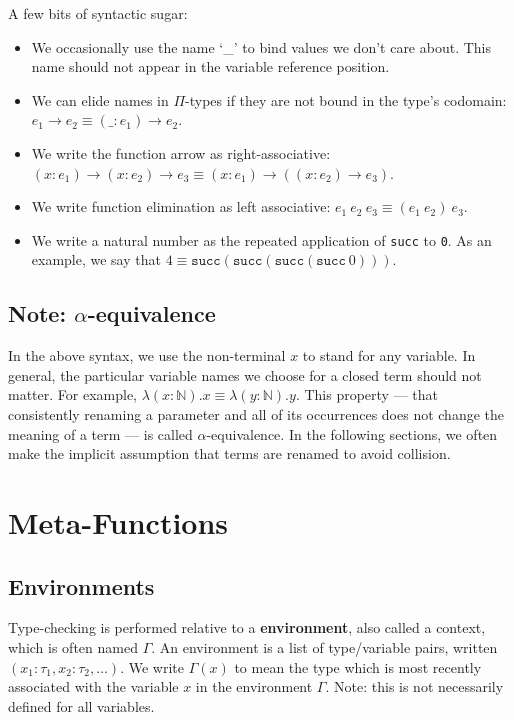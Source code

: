 \documentclass[12pt]{article}
\begin{document}
A few bits of syntactic sugar:
\begin{itemize}
\item We occasionally use the name `\_' to bind values we don't care about. This name should not appear in the variable reference position.
\item We can elide names in \(\Pi\)-types if they are not bound in the type's codomain: \(e_1 \rightarrow e_2 \equiv (\_ : e_1) \rightarrow e_2\).
\item We write the function arrow as right-associative: \((x : e_1) \rightarrow (x : e_2) \rightarrow e_3 \equiv (x : e_1) \rightarrow ((x : e_2) \rightarrow e_3)\).
\item We write function elimination as left associative: \(e_1\ e_2\ e_3 \equiv (e_1\ e_2)\ e_3\).
\item We write a natural number as the repeated application of \texttt{succ} to \texttt{0}. As an example, we say that \(4 \equiv \mathtt{succ}(\mathtt{succ} (\mathtt{succ} (\mathtt{succ}\ 0)))\).
\end{itemize}

\subsection*{Note: \(\alpha\)-equivalence}
\label{sec:orgf017d4e}

In the above syntax, we use the non-terminal \(x\) to stand for any variable. In general, the particular variable names we choose for a closed term should not matter. For example, \(\lambda (x : \mathbb{N}). x \equiv \lambda (y : \mathbb{N}). y\). This property --- that consistently renaming a parameter and all of its occurrences does not change the meaning of a term --- is called \(\alpha\)-equivalence. In the following sections, we often make the implicit assumption that terms are renamed to avoid collision.

\section*{Meta-Functions}
\label{sec:org0aab1ed}

\subsection*{Environments}
\label{sec:org3ee83b2}

Type-checking is performed relative to a \textbf{environment}, also called a context, which is often named \(\Gamma\). An environment is a list of type/variable pairs, written \((x_1 : \tau_1 , x_2 : \tau_2, \dots)\). We write \(\Gamma(x)\) to mean the type which is most recently associated with the variable \(x\) in the environment \(\Gamma\). Note: this is not necessarily defined for all variables.
\end{document}
